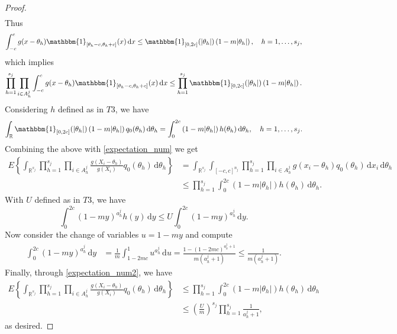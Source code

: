 \documentclass[12pt]{article}
\def \R {\mathbb{R} }
\def \d {\mathrm{d}}
\begin{document}
\begin{proof}
\[\begin{aligned}
\end{aligned}
\]
Thus
\[
\int_{-c}^{c}  g(x - \theta_h) \mathbbm{1}_{[\theta_h-c, \theta_h+c]}(x)\, \mathrm{d}x  \leq \mathbbm{1}_{[0,2c]}(|\theta_h|) \left(1-m|\theta_h|\right), \quad h = 1, \dots, s_j,
\]
which implies
\[
\prod_{h = 1}^{s_j} \prod_{i \in A^j_h} \int_{-c}^{c}  g(x - \theta_h) \mathbbm{1}_{[\theta_h-c, \theta_h+c]}(x)\, \mathrm{d}x  \leq \prod_{h = 1}^{s_j}\mathbbm{1}_{[0,2c]}(|\theta_h|) \left(1-m|\theta_h|\right).
\]
Considering $h$ defined as in $T3$, we have
\[
\int_{\R}\mathbbm{1}_{[0,2c]}(|\theta_h|) \left(1-m|\theta_h|\right)q_0(\theta_h) \, \d \theta_h = \int_0^{2c} \left(1-m|\theta_h|\right)h(\theta_h) \, \d \theta_h, \quad h =1, \dots, s_j.
\]
Combining the above with \eqref{expectation_num} we get
\begin{equation}\label{expectation_num2}
\begin{aligned}
E \left\{\int_{\R^{s_j}} \prod_{h = 1}^{s_j} \prod_{i \in A^j_h} \frac{g(X_i - \theta_h)}{g(X_i)} q_0(\theta_h)\, \mathrm{d}\theta_h \right\} %
& = \int_{\R^{s_j}} \int_{[-c,c]^{n_j}} \prod_{h = 1}^{s_j} \prod_{i \in A^j_h} g(x_i - \theta_h) q_0(\theta_h) \, \mathrm{d}x_i \, \mathrm{d}\theta_h\\
&\leq \prod_{h=1}^{s_j}\int_0^{2c} \left(1-m|\theta_h|\right)h(\theta_h) \, \d \theta_h.
\end{aligned}
\end{equation}
With $U$  defined as in $T3$, we have
\[
\int_{0}^{2c} (1-my)^{a_h^j} h(y) \, \mathrm{d}y \leq U \int_{0}^{2c} (1-m y)^{a_h^j} \, \mathrm{d}y.
\]
Now consider the change of variables $u = 1-my$ and compute
\[
\begin{aligned}
\int_{0}^{2c} (1-my)^{a_h^j} \, \mathrm{d}y &= \frac{1}{m} \int_{1-2 m c}^1u^{a_h^j} \, \mathrm{d}u = \frac{1-(1-2mc)^{a_h^j+1}}{m(a_h^j+1)} \leq \frac{1}{m(a_h^j+1)}.
\end{aligned}
\]
Finally, through \eqref{expectation_num2}, we have
\[
\begin{aligned}
E \left\{\int_{\R^{s_j}} \prod_{h = 1}^{s_j} \prod_{i \in A^j_h} \frac{g(X_i - \theta_h)}{g(X_i)} q_0(\theta_h)\, \mathrm{d}\theta_h \right\}  %
& \leq \prod_{h=1}^{s_j}\int_0^{2c} \left(1-m|\theta_h|\right)h(\theta_h) \, \d \theta_h\\
&\leq \left(\frac{U}{m}\right)^{s_j}\prod_{h = 1}^{s_j} \frac{1}{a_h^j+1},
\end{aligned}
\]
as desired.
\end{proof}
\end{document}
